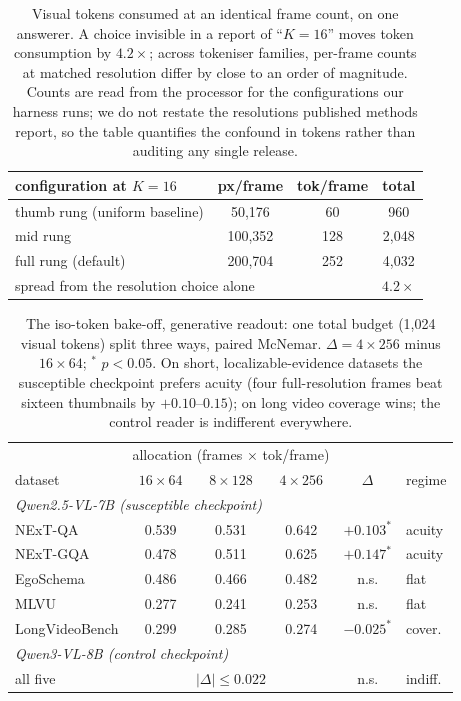 \documentclass[10pt,twocolumn,letterpaper]{article}
\begin{document}
\begin{table}[t]
\centering
\footnotesize
\setlength{\tabcolsep}{4pt}
\begin{tabular}{lccc}
\toprule
configuration at $K{=}16$ & px/frame & tok/frame & total\\
\midrule
thumb rung (uniform baseline) & 50,176 & 60 & 960\\
mid rung & 100,352 & 128 & 2,048\\
full rung (default) & 200,704 & 252 & 4,032\\
\midrule
\multicolumn{3}{l}{spread from the resolution choice alone} & $4.2\times$\\
\bottomrule
\end{tabular}
\caption{Visual tokens consumed at an identical frame count, on one answerer. A choice invisible in a report of ``$K{=}16$'' moves token consumption by $4.2\times$; across tokeniser families, per-frame counts at matched resolution differ by close to an order of magnitude. Counts are read from the processor for the configurations our harness runs; we do not restate the resolutions published methods report, so the table quantifies the confound in tokens rather than auditing any single release.}
\label{tab:tokens}
\end{table}

\begin{table}[t]
\centering
\footnotesize
\setlength{\tabcolsep}{3pt}
\begin{tabular}{lccccl}
\toprule
 & \multicolumn{3}{c}{allocation (frames $\times$ tok/frame)} & &\\
dataset & $16{\times}64$ & $8{\times}128$ & $4{\times}256$ & $\Delta$ & regime\\
\midrule
\multicolumn{6}{l}{\emph{Qwen2.5-VL-7B (susceptible checkpoint)}}\\
NExT-QA & 0.539 & 0.531 & 0.642 & $+0.103^{*}$ & acuity\\
NExT-GQA & 0.478 & 0.511 & 0.625 & $+0.147^{*}$ & acuity\\
EgoSchema & 0.486 & 0.466 & 0.482 & n.s. & flat\\
MLVU & 0.277 & 0.241 & 0.253 & n.s. & flat\\
LongVideoBench & 0.299 & 0.285 & 0.274 & $-0.025^{*}$ & cover.\\
\midrule
\multicolumn{6}{l}{\emph{Qwen3-VL-8B (control checkpoint)}}\\
all five & \multicolumn{3}{c}{$|\Delta|\le0.022$} & n.s. & indiff.\\
\bottomrule
\end{tabular}
\caption{The iso-token bake-off, generative readout: one total budget (1,024 visual tokens) split three ways, paired McNemar. $\Delta = 4{\times}256$ minus $16{\times}64$; $^{*}$ $p{<}0.05$. On short, localizable-evidence datasets the susceptible checkpoint prefers acuity (four full-resolution frames beat sixteen thumbnails by $+0.10$--$0.15$); on long video coverage wins; the control reader is indifferent everywhere.}
\label{tab:bakeoff}
\end{table}
\end{document}
